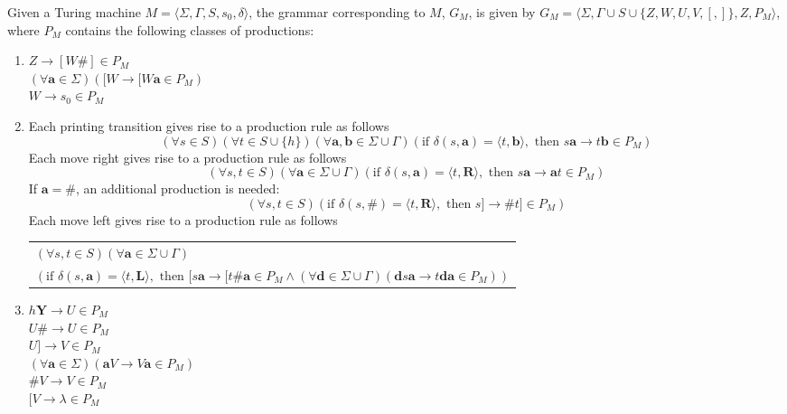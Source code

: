 \begin{dfn}\label{dfn-11.8}
Given a Turing machine $M=\langle\Sigma,\Gamma,S,s_0,\delta\rangle$, the grammar
corresponding to $M$, $G_M$, is given by $G_M=\langle\Sigma,\Gamma\cup S\cup\{Z,
W,U,V,[,]\},Z,P_M\rangle$, where $P_M$ contains the following classes of
productions:
\begin{enumerate}
\item $Z\rightarrow[W\pmb{\#}]\in P_M$ \\
$(\forall \pmb{a}\in\Sigma)([W\rightarrow[W\pmb{a}\in P_M)$ \\
$W\rightarrow s_0\in P_M$

\item Each printing transition gives rise to a production rule as follows
\[ (\forall s\in S)(\forall t\in S\cup\{h\})(\forall\pmb{a},\pmb{b}\in\Sigma\cup
	\Gamma)(\text{if }\delta(s,\pmb{a})=\langle t,\pmb{b}\rangle,
	\text{ then }s\pmb{a}\rightarrow t\pmb{b}\in P_M) \]
Each move right gives rise to a production rule as follows
\[ (\forall s,t\in S)(\forall\pmb{a}\in\Sigma\cup\Gamma)(\text{if }\delta(s,
	\pmb{a})=\langle t,\pmb{R}\rangle,\text{ then }s\pmb{a}\rightarrow
	\pmb{a}t\in P_M) \]
If $\pmb{a}=\pmb{\#}$, an additional production is needed:
\[ (\forall s,t\in S)(\text{if }\delta(s,\pmb{\#})=\langle t,\pmb{R}\rangle,
	\text{ then }s]\rightarrow\pmb{\#}t]\in P_M) \]
Each move left gives rise to a production rule as follows
\begin{center}\begin{tabular}{l}
$(\forall s,t\in S)(\forall\pmb{a}\in\Sigma\cup\Gamma)$ \\
$(\text{if }\delta(s,\pmb{a})=\langle t,\pmb{L}\rangle,\text{ then }[s\pmb{a}
	\rightarrow [t\pmb{\#a}\in P_M\wedge (\forall\pmb{d}\in\Sigma\cup\Gamma)
	(\pmb{d}s\pmb{a}\rightarrow t\pmb{da}\in P_M))$
\end{tabular}\end{center}

\item $h\pmb{Y}\rightarrow U\in P_M$ \\
$U\pmb{\#}\rightarrow U\in P_M$ \\
$U]\rightarrow V\in P_M$ \\
$(\forall\pmb{a}\in\Sigma)(\pmb{a}V\rightarrow V\pmb{a}\in P_M)$ \\
$\pmb{\#}V\rightarrow V\in P_M$ \\
$[V\rightarrow \lambda\in P_M$
\end{enumerate}
\end{dfn}

